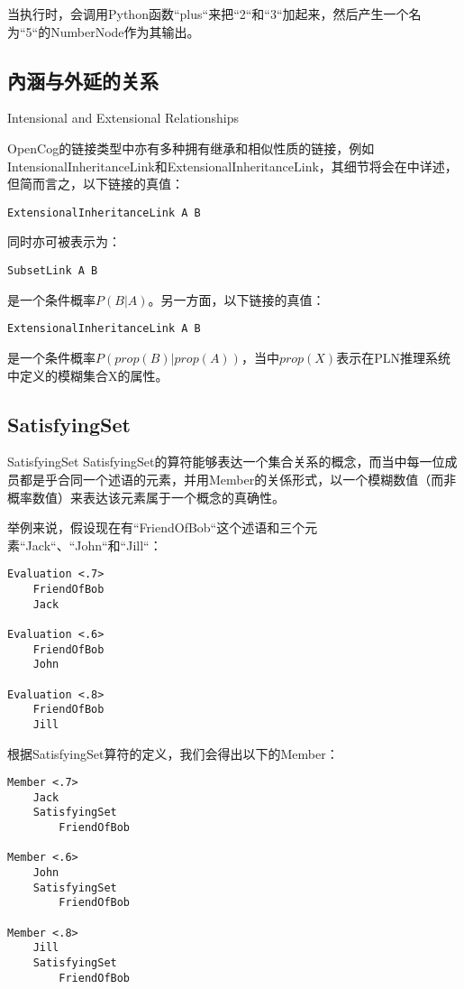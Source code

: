\noindent 当执行时，会调用Python函数“plus“来把“2“和“3“加起来，然后产生一个名为“5“的NumberNode作为其输出。

\subsection{內涵与外延的关系}{Intensional and Extensional Relationships}


OpenCog的链接类型中亦有多种拥有继承和相似性质的链接，例如IntensionalInheritanceLink和ExtensionalInheritanceLink，其细节将会在\cite{PLN}中详述，但简而言之，以下链接的真值：

\begin{verbatim}
ExtensionalInheritanceLink A B
\end{verbatim}

\noindent 同时亦可被表示为：

\begin{verbatim}
SubsetLink A B
\end{verbatim}

\noindent 是一个条件概率$P(B|A)$。另一方面，以下链接的真值：

\begin{verbatim}
ExtensionalInheritanceLink A B
\end{verbatim}

\noindent 是一个条件概率$P(prop(B)|prop(A))$，当中$prop(X)$表示在PLN推理系统中定义的模糊集合X的属性。

\subsection{SatisfyingSet}{SatisfyingSet}
SatisfyingSet的算符能够表达一个集合关系的概念，而当中每一位成员都是乎合同一个述语的元素，并用Member的关係形式，以一个模糊数值（而非概率数值）来表达该元素属于一个概念的真确性。

举例来说，假设现在有“FriendOfBob“这个述语和三个元素“Jack“、“John“和“Jill“：

\begin{verbatim}
Evaluation <.7>
	FriendOfBob
	Jack

Evaluation <.6>
	FriendOfBob
	John

Evaluation <.8>
	FriendOfBob
	Jill
\end{verbatim}

根据SatisfyingSet算符的定义，我们会得出以下的Member：

\begin{verbatim}
Member <.7>
	Jack
	SatisfyingSet
		FriendOfBob

Member <.6>
	John
	SatisfyingSet
		FriendOfBob

Member <.8>
	Jill
	SatisfyingSet
		FriendOfBob
\end{verbatim}

